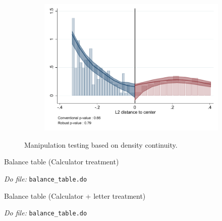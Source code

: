\documentclass[oneside,11pt]{article}
\begin{document}
\begin{figure}[H]
\begin{center}
\begin{subfigure}{0.49\textwidth}
        \includegraphics[width=\textwidth]{Figuras/mtp_index.pdf}
    \end{subfigure}
  \end{center}
  
    \scriptsize Manipulation testing based on density continuity.
\end{figure}




\begin{landscape}
\begin{table}[H]
\caption{Balance table (Calculator treatment)}
\label{balance_table_t2_tenure}
\begin{center}
\resizebox{1.5\textwidth}{!}{
\scriptsize{}
}
\end{center}
 \scriptsize 
\textit{Do file: } \texttt{balance\_table.do}
\end{table}


\begin{table}[H]
\caption{Balance table (Calculator + letter treatment)}
\label{balance_table_t2_tenure}
\begin{center}
\resizebox{1.5\textwidth}{!}{
\scriptsize{}
}
\end{center}
 \scriptsize 
\textit{Do file: } \texttt{balance\_table.do}
\end{table}


\end{landscape}

\end{document}
